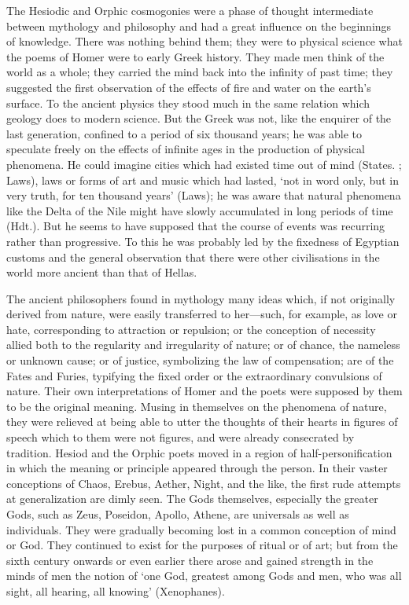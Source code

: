 \documentclass[11pt,letter]{article}
\begin{document}
\par  The Hesiodic and Orphic cosmogonies were a phase of thought intermediate between mythology and philosophy and had a great influence on the beginnings of knowledge. There was nothing behind them; they were to physical science what the poems of Homer were to early Greek history. They made men think of the world as a whole; they carried the mind back into the infinity of past time; they suggested the first observation of the effects of fire and water on the earth’s surface. To the ancient physics they stood much in the same relation which geology does to modern science. But the Greek was not, like the enquirer of the last generation, confined to a period of six thousand years; he was able to speculate freely on the effects of infinite ages in the production of physical phenomena. He could imagine cities which had existed time out of mind (States. ; Laws), laws or forms of art and music which had lasted, ‘not in word only, but in very truth, for ten thousand years’ (Laws); he was aware that natural phenomena like the Delta of the Nile might have slowly accumulated in long periods of time (Hdt.). But he seems to have supposed that the course of events was recurring rather than progressive. To this he was probably led by the fixedness of Egyptian customs and the general observation that there were other civilisations in the world more ancient than that of Hellas.

\par  The ancient philosophers found in mythology many ideas which, if not originally derived from nature, were easily transferred to her—such, for example, as love or hate, corresponding to attraction or repulsion; or the conception of necessity allied both to the regularity and irregularity of nature; or of chance, the nameless or unknown cause; or of justice, symbolizing the law of compensation; are of the Fates and Furies, typifying the fixed order or the extraordinary convulsions of nature. Their own interpretations of Homer and the poets were supposed by them to be the original meaning. Musing in themselves on the phenomena of nature, they were relieved at being able to utter the thoughts of their hearts in figures of speech which to them were not figures, and were already consecrated by tradition. Hesiod and the Orphic poets moved in a region of half-personification in which the meaning or principle appeared through the person. In their vaster conceptions of Chaos, Erebus, Aether, Night, and the like, the first rude attempts at generalization are dimly seen. The Gods themselves, especially the greater Gods, such as Zeus, Poseidon, Apollo, Athene, are universals as well as individuals. They were gradually becoming lost in a common conception of mind or God. They continued to exist for the purposes of ritual or of art; but from the sixth century onwards or even earlier there arose and gained strength in the minds of men the notion of ‘one God, greatest among Gods and men, who was all sight, all hearing, all knowing’ (Xenophanes).
\end{document}
